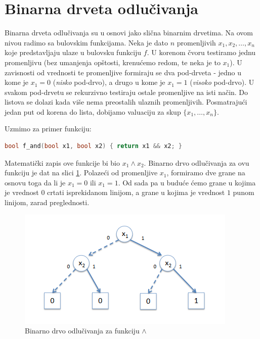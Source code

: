 \section{Binarna drveta odlu\v{c}ivanja}
\label{sec:BinarnaDrvetaOdlucivanja}

Binarna drveta odlu\v{c}ivanja su u osnovi jako sli\v{c}na binarnim drvetima. Na ovom nivou radimo sa bulovskim funkcijama. Neka je dato $n$ promenljivih $x_{1}, x_{2}, \dots , x_{n}$ koje predstavljaju ulaze u bulovsku funkciju $f$. U korenom \v{c}voru testiramo jednu promenljivu (bez umanjenja op\v{s}tosti, krenu\'c{}emo redom, te neka je to $x_{1}$). U zavisnosti od vrednosti te promenljive formiraju se dva pod-drveta - jedno u kome je $x_{1} = 0$ (\emph{nisko} pod-drvo), a drugo u kome je $x_{1} = 1$ (\emph{visoko} pod-drvo). U svakom pod-drvetu se rekurzivno testiraju ostale promenljive na isti na\v{c}in. Do listova se dolazi kada vi\v{s}e nema preostalih ulaznih promenljivih. Posmatraju\'c{}i jedan put od korena do lista, dobijamo valuaciju za skup $\{x_{1}, \dots , x_{n}\}$.

Uzmimo za primer funkciju:

\begin{lstlisting}[language=C++]
    bool f_and(bool x1, bool x2) { return x1 && x2; }
\end{lstlisting}

\noindent Matematički zapis ove funkcije bi bio $x_{1} \wedge x_{2}$. Binarno drvo odlu\v{c}ivanja za ovu funkciju je dat na slici \ref{diag:BDAnd}. Polaze\'c{}i od promenljive $x_{1}$, formiramo dve grane na osnovu toga da li je $x_{1} = 0$ ili $x_{1} = 1$. Od sada pa u budu\'c{}e \'c{}emo grane u kojima je vrednost $0$ crtati isprekidanom linijom, a grane u kojima je vrednost $1$ punom linijom, zarad preglednosti.

\begin{figure}[H]
    \centering
    \includegraphics[scale=0.8]{slike/BD_And.PNG}
    \caption{Binarno drvo odlu\v{c}ivanja za funkciju $\wedge$}
    \label{diag:BDAnd}
\end{figure}

